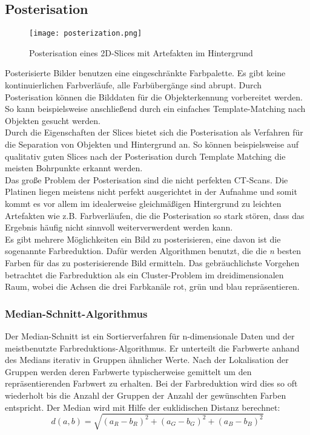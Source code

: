 \subsection {Posterisation}
\begin{figure}[H]
  \begin{center}
    \texttt{[image: posterization.png]}
    \caption{Posterisation eines 2D-Slices mit Artefakten im Hintergrund}
    \label{fig:posterization1}
  \end{center}
\end{figure}

Posterisierte Bilder benutzen eine eingeschränkte Farbpalette. Es gibt keine kontinuierlichen Farbverläufe, alle Farbübergänge sind abrupt. Durch Posterisation können die Bilddaten für die Objekterkennung vorbereitet werden. So kann beispielsweise anschließend durch ein einfaches Template-Matching nach Objekten gesucht werden. \\
Durch die Eigenschaften der Slices bietet sich die Posterisation als Verfahren für die Separation von Objekten und Hintergrund an. So können beispielsweise auf qualitativ guten Slices nach der Posterisation durch Template Matching die meisten Bohrpunkte erkannt werden. \\
Das große Problem der Posterisation sind die nicht perfekten CT-Scans. Die Platinen liegen meistens nicht perfekt ausgerichtet in der Aufnahme und somit kommt es vor allem im idealerweise gleichmäßigen Hintergrund zu leichten Artefakten wie z.B. Farbverläufen, die die Posterisation so stark stören, dass das Ergebnis häufig nicht sinnvoll weiterverwerdent werden kann. \\
Es gibt mehrere Möglichkeiten ein Bild zu posterisieren, eine davon ist die sogenannte Farbreduktion. Dafür werden Algorithmen benutzt, die die \textit{n} besten Farben für das zu posterisierende Bild ermitteln. Das gebräuchlichste Vorgehen betrachtet die Farbreduktion als ein Cluster-Problem im dreidimensionalen Raum, wobei die Achsen die drei Farbkanäle rot, grün und blau repräsentieren.
\subsubsection {Median-Schnitt-Algorithmus}
Der Median-Schnitt \cite{Kruger1994} ist ein Sortierverfahren für n-dimensionale Daten und der meistbenutzte Farbreduktions-Algorithmus. Er unterteilt die Farbwerte anhand des Medians iterativ in Gruppen ähnlicher Werte. Nach der Lokalisation der Gruppen werden deren Farbwerte typischerweise gemittelt um den repräsentierenden Farbwert zu erhalten. Bei der Farbreduktion wird dies so oft wiederholt bis die Anzahl der Gruppen der Anzahl der gewünschten Farben entspricht. Der Median  wird mit Hilfe der euklidischen Distanz berechnet:
\begin{equation*}
d(a,b)=\sqrt{(a_R-b_R)^2 + (a_G-b_G)^2 + (a_B-b_B)^2}
\end{equation*}
